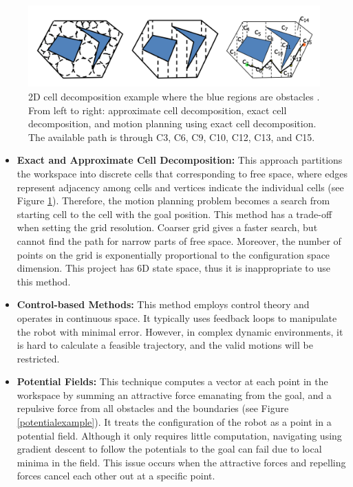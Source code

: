 \begin{figure}[H]
\centering
\includegraphics[width = \columnwidth]{background/cell.png}
\caption{2D cell decomposition example where the blue regions are obstacles \citep{celldecom}. From left to right: approximate cell decomposition, exact cell decomposition, and motion planning using exact cell decomposition. The available path is through C3, C6, C9, C10, C12, C13, and C15.}
\label{cell}
\end{figure}

\begin{itemize}
    \item \textbf{Exact and Approximate Cell Decomposition:} This approach partitions the workspace into discrete cells that corresponding to free space, where edges represent adjacency among cells and vertices indicate the individual cells (see Figure \ref{cell}). Therefore, the motion planning problem becomes a search from starting cell to the cell with the goal position. This method has a trade-off when setting the grid resolution. Coarser grid gives a faster search, but cannot find the path for narrow parts of free space. Moreover, the number of points on the grid is exponentially proportional to the configuration space dimension. This project has 6D state space, thus it is inappropriate to use this method.

    \item \textbf{Control-based Methods:} This method employs control theory and operates in continuous space. It typically uses feedback loops to manipulate the robot with minimal error. However, in complex dynamic environments, it is hard to calculate a feasible trajectory, and the valid motions will be restricted.

    \item \textbf{Potential Fields:} This technique computes a vector at each point in the workspace by summing an attractive force emanating from the goal, and a repulsive force from all obstacles and the boundaries (see Figure \ref{potentialexample}). It treats the configuration of the robot as a point in a potential field. Although it only requires little computation, navigating using gradient descent to follow the potentials to the goal can fail due to local minima in the field. This issue occurs when the attractive forces and repelling forces cancel each other out at a specific point.
\end{itemize}

